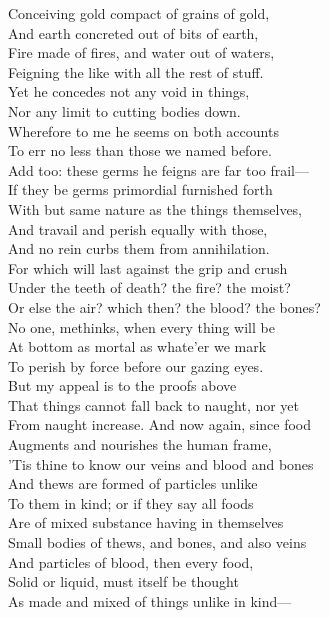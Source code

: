 Conceiving gold compact of grains of gold,\\
And earth concreted out of bits of earth,\\
Fire made of fires, and water out of waters,\\
Feigning the like with all the rest of stuff.\\
Yet he concedes not any void in things,\\
Nor any limit to cutting bodies down.\\
Wherefore to me he seems on both accounts\\
To err no less than those we named before.\\
Add too: these germs he feigns are far too frail—\\
If they be germs primordial furnished forth\\
With but same nature as the things themselves,\\
And travail and perish equally with those,\\
And no rein curbs them from annihilation.\\
For which will last against the grip and crush\\
Under the teeth of death? the fire? the moist?\\
Or else the air? which then? the blood? the bones?\\
No one, methinks, when every thing will be\\
At bottom as mortal as whate'er we mark\\
To perish by force before our gazing eyes.\\
But my appeal is to the proofs above\\
That things cannot fall back to naught, nor yet\\
From naught increase. And now again, since food\\
Augments and nourishes the human frame,\\
'Tis thine to know our veins and blood and bones\\
And thews are formed of particles unlike\\
To them in kind; or if they say all foods\\
Are of mixed substance having in themselves\\
Small bodies of thews, and bones, and also veins\\
And particles of blood, then every food,\\
Solid or liquid, must itself be thought\\
As made and mixed of things unlike in kind—\\
